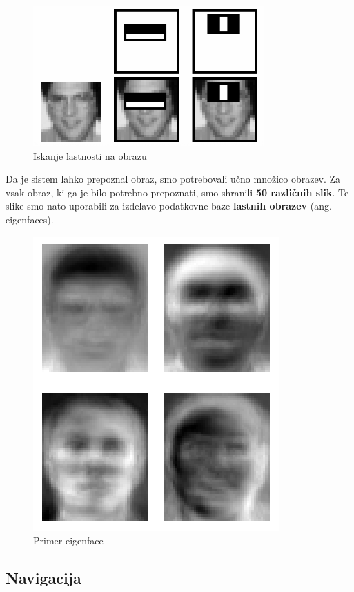 \documentclass[a4paper,11pt]{article}
\begin{document}
\begin{figure}[h]
\begin{center}
\includegraphics[scale=0.7]{haar.png}
\caption{Iskanje lastnosti na obrazu}
\label{slika1}
\end{center}
\end{figure}

Da je sistem lahko prepoznal obraz, smo potrebovali učno množico obrazev. Za vsak obraz, ki ga je bilo potrebno prepoznati, smo shranili \textbf{50 različnih slik}. Te slike smo nato uporabili za izdelavo podatkovne baze \textbf{lastnih obrazev} (ang. eigenfaces).

\begin{figure}[h]
\begin{center}
\includegraphics[scale=0.4]{Eigenfaces.png}
\caption{Primer eigenface}
\label{slika1}
\end{center}
\end{figure}

\subsection{Navigacija}
\end{document}
